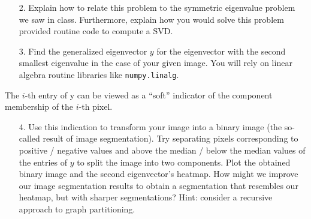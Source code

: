 \documentclass[11pt]{article}
\begin{document}
\begin{enumerate}
    \item[2.] Explain how to relate this problem to the symmetric eigenvalue problem we saw in class. Furthermore, explain how you would solve this problem provided routine code to compute a SVD.
\end{enumerate}

\begin{enumerate}
    \item[3.] Find the generalized eigenvector $y$ for the eigenvector with the second smallest eigenvalue in the case of your given image. You will rely on linear algebra routine libraries like \texttt{numpy.linalg}.
\end{enumerate}

The $i$-th entry of y can be viewed as a “soft” indicator of the component membership of the $i$-th pixel.

\begin{enumerate}

\item[4.] Use this indication to transform your image into a binary image (the so-called result of image segmentation). Try separating pixels corresponding to positive / negative values and above the median / below the median values of the entries of $y$ to split the image into two components. Plot the obtained binary image and the second eigenvector's heatmap. How might we improve our image segmentation results to obtain a segmentation that resembles our heatmap, but with sharper segmentations? Hint: consider a recursive approach to graph partitioning.
\end{enumerate}
\end{document}
